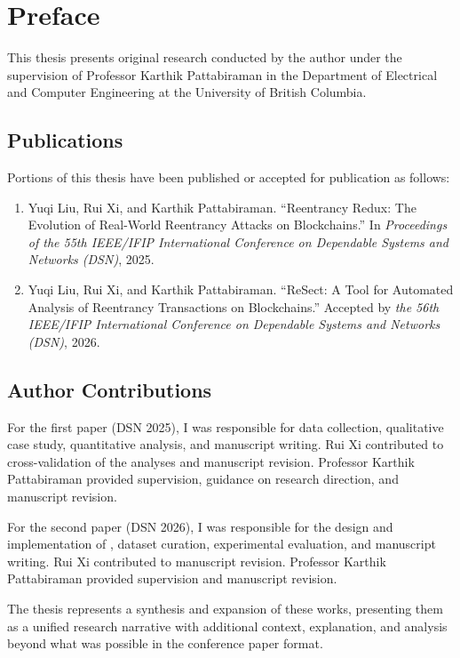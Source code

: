 \chapter{Preface}

This thesis presents original research conducted by the author under the supervision of Professor Karthik Pattabiraman in the Department of Electrical and Computer Engineering at the University of British Columbia.

\section*{Publications}

Portions of this thesis have been published or accepted for publication as follows:

\begin{enumerate}
    \item Yuqi Liu, Rui Xi, and Karthik Pattabiraman. ``Reentrancy Redux: The Evolution of Real-World Reentrancy Attacks on Blockchains.'' In \textit{Proceedings of the 55th IEEE/IFIP International Conference on Dependable Systems and Networks (DSN)}, 2025.

    \item Yuqi Liu, Rui Xi, and Karthik Pattabiraman. ``ReSect: A Tool for Automated Analysis of Reentrancy Transactions on Blockchains.'' Accepted by \textit{the 56th IEEE/IFIP International Conference on Dependable Systems and Networks (DSN)}, 2026.
\end{enumerate}

\section*{Author Contributions}

For the first paper (DSN 2025), I was responsible for data collection, qualitative case study, quantitative analysis, and manuscript writing. Rui Xi contributed to cross-validation of the analyses and manuscript revision. Professor Karthik Pattabiraman provided supervision, guidance on research direction, and manuscript revision.

For the second paper (DSN 2026), I was responsible for the design and implementation of \ToolName, dataset curation, experimental evaluation, and manuscript writing. Rui Xi contributed to manuscript revision. Professor Karthik Pattabiraman provided supervision and manuscript revision.

The thesis represents a synthesis and expansion of these works, presenting them as a unified research narrative with additional context, explanation, and analysis beyond what was possible in the conference paper format.

